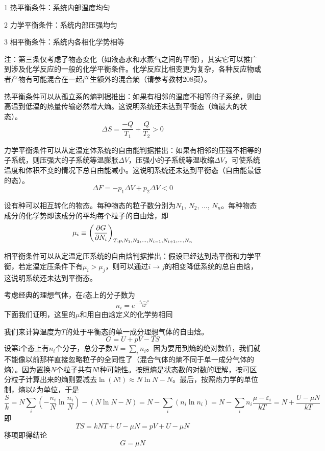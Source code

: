 \documentclass[CJK]{beamer}
\begin{document}
\begin{frame}
\bch
\bitem
\item[1]{\blue 热平衡条件：系统内部温度均匀}
\item[2]{\blue 力学平衡条件：系统内部压强均匀}
\item[3]{\blue 相平衡条件：系统内各相化学势相等}
\eitem

{\scriptsize
注：第三条仅考虑了物态变化（如液态水和水蒸气之间的平衡），其实它可以推广到涉及化学反应的一般的化学平衡条件。化学反应比相变更为复杂，各种反应物或者产物有可能混合在一起产生额外的混合熵（请参考教材208页）。
}
\ech
\end{frame}


\begin{frame}
\bch
热平衡条件可以从孤立系的熵判据推出：如果有相邻的温度不相等的子系统，则由高温到低温的热量传输必然增大熵。这说明系统还未达到平衡态（熵最大的状态）。
$$\Delta S = \frac{-Q}{T_1} + \frac{Q}{T_2} > 0$$
\ech
\end{frame}

\begin{frame}
\bch
力学平衡条件可以从定温定体系统的自由能判据推出：如果有相邻的压强不相等的子系统，则压强大的子系统等温膨胀$\Delta V$，压强小的子系统等温收缩$\Delta V$，可使系统温度和体积不变的情况下总自由能减小。这说明系统还未达到平衡态（自由能最低的态）。
$$\Delta F = -p_1 \Delta V + p_2 \Delta V < 0 $$
\ech
\end{frame}


\begin{frame}
\bch
设有种可以相互转化的物态。每种物态的粒子数分别为$N_1$, $N_2$, $\ldots$, $N_n$。每种物态成分的化学势即该成分的平均每个粒子的自由焓，即
$$ \mu_i \equiv \left(\frac{\partial G}{\partial N_i}\right)_{T,p,N_1, N_2, \ldots, N_{i-1}, N_{i+1}, \ldots, N_n} $$


相平衡条件可以从定温定压系统的自由焓判据推出：假设已经达到热平衡和力学平衡，若定温定压条件下有$ \mu_i > \mu_j$，则可以通过$i\rightarrow j$的相变降低系统的总自由焓，这说明系统还未达到平衡态。
\ech
\end{frame}


\begin{frame}
\bch
{\small
考虑经典的理想气体，在$i$态上的分子数为
$$ n_i = e^{-\frac{\varepsilon_i-\mu}{kT}}$$
下面我们证明，这里的$\mu$和用自由焓定义的化学势相同}

{\scriptsize
  我们来计算温度为$T$的处于平衡态的单一成分理想气体的自由焓。
  $$G = U + pV - TS$$
  设第i个态上有$n_i$个分子，总分子数$N=\sum_i n_i$。因为要用到熵的绝对数值，我们就不能像以前那样直接忽略粒子的全同性了（混合气体的熵不同于单一成分气体的熵）。因为置换$N$个粒子共有$N!$种可能性。按照熵是状态数的对数的理解，按可区分粒子计算出来的熵则要减去$\ln (N!) \approx N \ln N - N $。最后，按照热力学的单位制，熵以$k$为单位，于是
  $$\frac{S}{k} = N\sum_i\left(-\frac{n_i}{N}\ln\frac{n_i}{N}\right)  - (N\ln N - N) = N-\sum_i (n_i\ln n_i) = N - \sum_in_i\frac{\mu - \varepsilon_i}{kT} =N+\frac{U-\mu N}{kT}  $$
  即
  $$TS = kNT + U - \mu N = pV + U - \mu N$$
  移项即得结论$$ G = \mu N$$
}
\ech
\end{frame}
\end{document}
